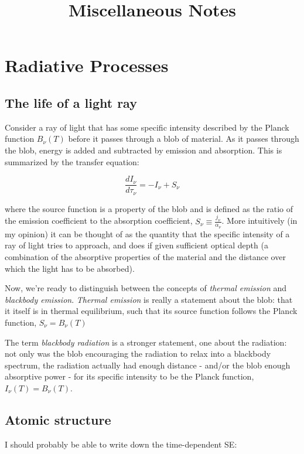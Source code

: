 \documentclass[12pt, letterpaper, preprint]{aastex}
\begin{document}
\title{Miscellaneous Notes}

\section*{Radiative Processes}

\subsection{The life of a light ray}

Consider a ray of light that has some specific intensity
described by the Planck function $B_\nu (T)$
before it passes through a blob of material.
As it passes through the blob, energy is added and
subtracted by emission and absorption.
This is summarized by the transfer equation:

\begin{equation}
\frac{dI_\nu}{d \tau_\nu} = -I_\nu + S_\nu
\end{equation}

where the source function is a property of the blob
and is defined as the ratio of the
emission coefficient to the absorption coefficient,
$S_\nu \equiv \frac{j_\nu}{\alpha_\nu} $. 
More intuitively (in my opinion) it can be thought of as the quantity that the specific intensity of a ray of light tries to approach, and does if given sufficient optical depth
(a combination of the absorptive properties of the material
and the distance over which the light has to be absorbed).

Now, we're ready to distinguish between the concepts of
\emph{thermal emission} and \emph{blackbody emission}.
\emph{Thermal emission} is really a statement about the
blob: that it itself is in thermal equilibrium,
such that its source function follows the Planck function,
$S_\nu = B_\nu (T)$

The term \emph{blackbody radiation} is a stronger statement,
one about the radiation: not only was the blob encouraging
the radiation to relax into a blackbody spectrum,
the radiation actually had enough distance - and/or the blob
enough absorptive power - for its specific intensity to
be the Planck function, $I_\nu (T) = B_\nu (T)$.

\subsection{Atomic structure}

I should probably be able to write down the time-dependent SE:
\end{document}
